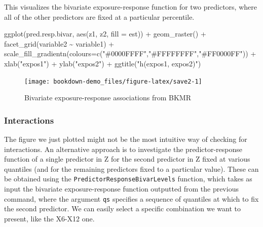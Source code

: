 \documentclass[
]{book}
\newenvironment{Shaded}{\begin{snugshade}}{\end{snugshade}}
\newcommand{\AttributeTok}[1]{\textcolor[rgb]{0.77,0.63,0.00}{#1}}
\newcommand{\FunctionTok}[1]{\textcolor[rgb]{0.00,0.00,0.00}{#1}}
\newcommand{\NormalTok}[1]{#1}
\newcommand{\SpecialCharTok}[1]{\textcolor[rgb]{0.00,0.00,0.00}{#1}}
\newcommand{\StringTok}[1]{\textcolor[rgb]{0.31,0.60,0.02}{#1}}
\begin{document}
This visualizes the bivariate exposure-response function for two predictors, where all of the other predictors are fixed at a particular percentile.

\begin{Shaded}
\begin{Highlighting}[]
\FunctionTok{ggplot}\NormalTok{(pred.resp.bivar, }\FunctionTok{aes}\NormalTok{(z1, z2, }\AttributeTok{fill =}\NormalTok{ est)) }\SpecialCharTok{+} 
  \FunctionTok{geom\_raster}\NormalTok{() }\SpecialCharTok{+} 
  \FunctionTok{facet\_grid}\NormalTok{(variable2 }\SpecialCharTok{\textasciitilde{}}\NormalTok{ variable1) }\SpecialCharTok{+}
  \FunctionTok{scale\_fill\_gradientn}\NormalTok{(}\AttributeTok{colours=}\FunctionTok{c}\NormalTok{(}\StringTok{"\#0000FFFF"}\NormalTok{,}\StringTok{"\#FFFFFFFF"}\NormalTok{,}\StringTok{"\#FF0000FF"}\NormalTok{)) }\SpecialCharTok{+}
  \FunctionTok{xlab}\NormalTok{(}\StringTok{"expos1"}\NormalTok{) }\SpecialCharTok{+}
  \FunctionTok{ylab}\NormalTok{(}\StringTok{"expos2"}\NormalTok{) }\SpecialCharTok{+}
  \FunctionTok{ggtitle}\NormalTok{(}\StringTok{"h(expos1, expos2)"}\NormalTok{)}
\end{Highlighting}
\end{Shaded}

\begin{figure}[H]

{\centering \texttt{[image: bookdown-demo\_files/figure-latex/save2-1]} 

}

\caption{Bivariate exposure-response associations from BKMR}\label{fig:save2}
\end{figure}

\hypertarget{interactions}{%
\subsubsection{Interactions}\label{interactions}}

The figure we just plotted might not be the most intuitive way of checking for interactions. An alternative approach is to investigate the predictor-response function of a single predictor in Z for the second predictor in Z fixed at various quantiles (and for the remaining predictors fixed to a particular value). These can be obtained using the \texttt{PredictorResponseBivarLevels} function, which takes as input the bivariate exposure-response function outputted from the previous command, where the argument \texttt{qs} specifies a sequence of quantiles at which to fix the second predictor. We can easily select a specific combination we want to present, like the X6-X12 one.
\end{document}
